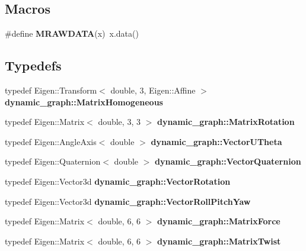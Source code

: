 \subsection*{Macros}
\begin{DoxyCompactItemize}
\item 
\mbox{\label{matrix__geometry_8hh_a57a66b4c84cff81707e398b940e1ef68}} 
\#define {\bfseries M\+R\+A\+W\+D\+A\+TA}(x)~x.\+data()
\end{DoxyCompactItemize}
\subsection*{Typedefs}
\begin{DoxyCompactItemize}
\item 
\mbox{\label{namespacedynamic__graph_a1cf832cafc093c1600db8cc4436661bb}} 
typedef Eigen\+::\+Transform$<$ double, 3, Eigen\+::\+Affine $>$ {\bfseries dynamic\+\_\+graph\+::\+Matrix\+Homogeneous}
\item 
\mbox{\label{namespacedynamic__graph_a50d1b342105103d3078687b78d5e8197}} 
typedef Eigen\+::\+Matrix$<$ double, 3, 3 $>$ {\bfseries dynamic\+\_\+graph\+::\+Matrix\+Rotation}
\item 
\mbox{\label{namespacedynamic__graph_aabaea0c174dde41c755e8d3fb6d23caa}} 
typedef Eigen\+::\+Angle\+Axis$<$ double $>$ {\bfseries dynamic\+\_\+graph\+::\+Vector\+U\+Theta}
\item 
\mbox{\label{namespacedynamic__graph_a9f22f1c9369a98e94778717faeec3f4b}} 
typedef Eigen\+::\+Quaternion$<$ double $>$ {\bfseries dynamic\+\_\+graph\+::\+Vector\+Quaternion}
\item 
\mbox{\label{namespacedynamic__graph_afe3e8341b18b6a3b59f2fa579c2e12c1}} 
typedef Eigen\+::\+Vector3d {\bfseries dynamic\+\_\+graph\+::\+Vector\+Rotation}
\item 
\mbox{\label{namespacedynamic__graph_af84ad658e1cf7d496958772210dd51b6}} 
typedef Eigen\+::\+Vector3d {\bfseries dynamic\+\_\+graph\+::\+Vector\+Roll\+Pitch\+Yaw}
\item 
\mbox{\label{namespacedynamic__graph_a43b4e15f6e943f7208372fd22ea108eb}} 
typedef Eigen\+::\+Matrix$<$ double, 6, 6 $>$ {\bfseries dynamic\+\_\+graph\+::\+Matrix\+Force}
\item 
\mbox{\label{namespacedynamic__graph_a933ba3678a5e0b14430acd27709cdf47}} 
typedef Eigen\+::\+Matrix$<$ double, 6, 6 $>$ {\bfseries dynamic\+\_\+graph\+::\+Matrix\+Twist}
\end{DoxyCompactItemize}
